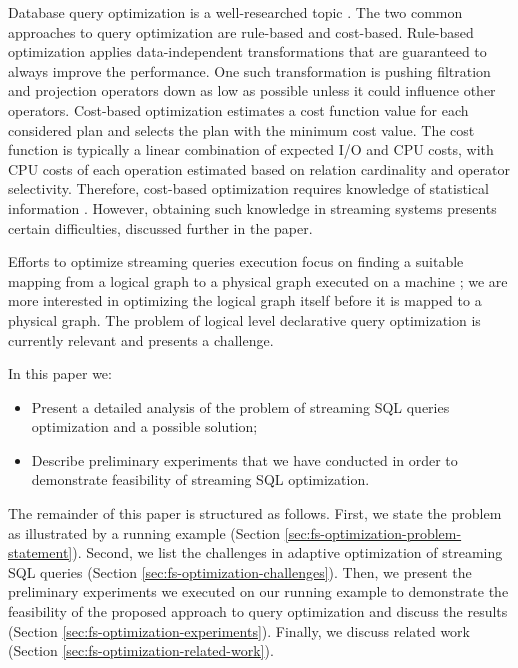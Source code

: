 Database query optimization is a well-researched topic \cite{astrahan1976system, haas1989extensible, graefe1993volcano}. 
The two common approaches to query optimization are rule-based and cost-based. Rule-based optimization applies data-independent transformations that are guaranteed to always improve the performance. One such transformation is pushing filtration and projection operators down as low as possible unless it could influence other operators. Cost-based optimization estimates a cost function value for each considered plan and selects the plan with the minimum cost value. The cost function is typically a linear combination of expected I/O and CPU costs, with CPU costs of each operation estimated based on relation cardinality and operator selectivity. Therefore, cost-based optimization requires knowledge of statistical information \cite{Neumann2018optimization}. However, obtaining such knowledge in streaming systems presents certain difficulties, discussed further in the paper.

Efforts to optimize streaming queries execution focus on finding a suitable mapping from a logical graph to a physical graph executed on a machine \cite{grulich2020grizzly, gedik2009code}; we are more interested in optimizing the logical graph itself before it is mapped to a physical graph. The problem of logical level declarative query optimization is currently relevant and presents a challenge.


In this paper we:
\begin{itemize}
    \item Present a detailed analysis of the problem of streaming SQL queries optimization and a possible solution;
    \item Describe preliminary experiments that we have conducted in order to demonstrate feasibility of streaming SQL optimization.
\end{itemize}

The remainder of this paper is structured as follows. First, we state the problem as illustrated by a running example (Section \ref{sec:fs-optimization-problem-statement}). Second, we list the challenges in adaptive optimization of streaming SQL queries (Section \ref{sec:fs-optimization-challenges}). Then, we present the preliminary experiments we executed on our running example to demonstrate the feasibility of the proposed approach to query optimization and discuss the results (Section \ref{sec:fs-optimization-experiments}). Finally, we discuss related work (Section \ref{sec:fs-optimization-related-work}).     



